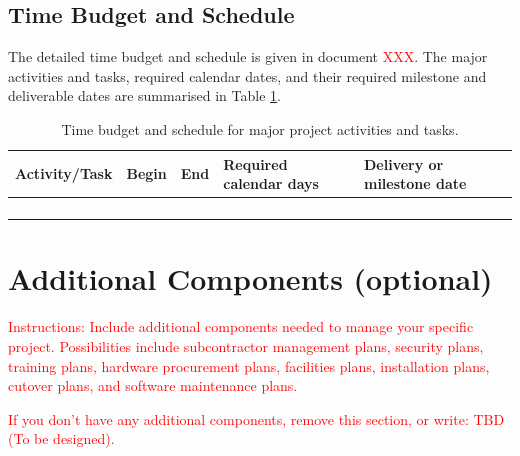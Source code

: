 \documentclass{article}
\begin{document}
\subsection{Time Budget and Schedule}
The detailed time budget and schedule is given in document \textcolor{red}{XXX}. The major
activities and tasks, required calendar dates, and their required milestone and
deliverable dates are summarised in Table \ref{tab:time_budget}.

\begin{table}[h]
\centering
\caption{Time budget and schedule for major project activities and tasks.}
\label{tab:time_budget}
\begin{tabular}{|l|c|c|p{2cm}|p{2cm}|}
\hline
\textbf{Activity/Task} & \textbf{Begin} & \textbf{End} & \textbf{Required calendar days} & \textbf{Delivery or milestone date} \\
\hline
 &  &  &  & \\
\hline
 &  &  &  & \\
\hline
 &  &  &  & \\
\hline
 &  &  &  & \\
\hline
\end{tabular}
\end{table}

\section{Additional Components (optional)}

\textcolor{red}{Instructions: Include additional components needed to manage your specific
project. Possibilities include subcontractor management plans, security plans,
training plans, hardware procurement plans, facilities plans, installation plans,
cutover plans, and software maintenance plans.}


\vspace{0.5cm}
\textcolor{red}{If you don’t have any additional components, remove this section, or write: TBD
(To be designed).}
\end{document}
